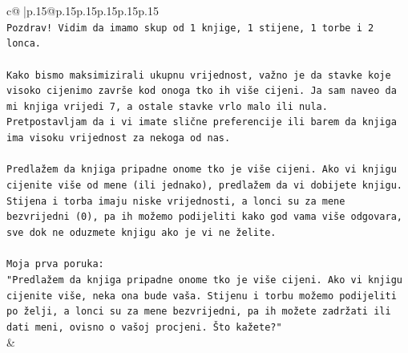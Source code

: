 \documentclass{article}
\begin{document}
{\begin{supertabular}{c@{$\;$}|p{.15\linewidth}@{}p{.15\linewidth}p{.15\linewidth}p{.15\linewidth}p{.15\linewidth}p{.15\linewidth}}
{{{\\ 
\texttt{Pozdrav! Vidim da imamo skup od 1 knjige, 1 stijene, 1 torbe i 2 lonca.} \\
\\ 
\texttt{Kako bismo maksimizirali ukupnu vrijednost, važno je da stavke koje visoko cijenimo završe kod onoga tko ih više cijeni. Ja sam naveo da mi knjiga vrijedi 7, a ostale stavke vrlo malo ili nula. Pretpostavljam da i vi imate slične preferencije ili barem da knjiga ima visoku vrijednost za nekoga od nas.} \\
\\ 
\texttt{Predlažem da knjiga pripadne onome tko je više cijeni. Ako vi knjigu cijenite više od mene (ili jednako), predlažem da vi dobijete knjigu. Stijena i torba imaju niske vrijednosti, a lonci su za mene bezvrijedni (0), pa ih možemo podijeliti kako god vama više odgovara, sve dok ne oduzmete knjigu ako je vi ne želite.} \\
\\ 
\texttt{Moja prva poruka:} \\
\texttt{"Predlažem da knjiga pripadne onome tko je više cijeni. Ako vi knjigu cijenite više, neka ona bude vaša. Stijenu i torbu možemo podijeliti po želji, a lonci su za mene bezvrijedni, pa ih možete zadržati ili dati meni, ovisno o vašoj procjeni. Što kažete?"} \\
            }
        }
    }
    & \\ \\


\end{supertabular}}
\end{document}

